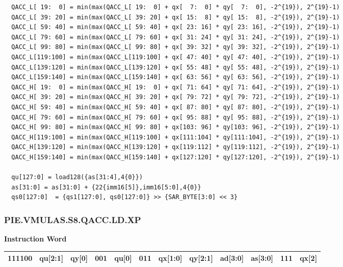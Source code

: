 \begin{lstlisting}
  QACC_L[ 19:  0] = min(max(QACC_L[ 19:  0] + qx[  7:  0] * qy[  7:  0], -2^{19}), 2^{19}-1)
  QACC_L[ 39: 20] = min(max(QACC_L[ 39: 20] + qx[ 15:  8] * qy[ 15:  8], -2^{19}), 2^{19}-1)
  QACC_L[ 59: 40] = min(max(QACC_L[ 59: 40] + qx[ 23: 16] * qy[ 23: 16], -2^{19}), 2^{19}-1)
  QACC_L[ 79: 60] = min(max(QACC_L[ 79: 60] + qx[ 31: 24] * qy[ 31: 24], -2^{19}), 2^{19}-1)
  QACC_L[ 99: 80] = min(max(QACC_L[ 99: 80] + qx[ 39: 32] * qy[ 39: 32], -2^{19}), 2^{19}-1)
  QACC_L[119:100] = min(max(QACC_L[119:100] + qx[ 47: 40] * qy[ 47: 40], -2^{19}), 2^{19}-1)
  QACC_L[139:120] = min(max(QACC_L[139:120] + qx[ 55: 48] * qy[ 55: 48], -2^{19}), 2^{19}-1)
  QACC_L[159:140] = min(max(QACC_L[159:140] + qx[ 63: 56] * qy[ 63: 56], -2^{19}), 2^{19}-1)
  QACC_H[ 19:  0] = min(max(QACC_H[ 19:  0] + qx[ 71: 64] * qy[ 71: 64], -2^{19}), 2^{19}-1)
  QACC_H[ 39: 20] = min(max(QACC_H[ 39: 20] + qx[ 79: 72] * qy[ 79: 72], -2^{19}), 2^{19}-1)
  QACC_H[ 59: 40] = min(max(QACC_H[ 59: 40] + qx[ 87: 80] * qy[ 87: 80], -2^{19}), 2^{19}-1)
  QACC_H[ 79: 60] = min(max(QACC_H[ 79: 60] + qx[ 95: 88] * qy[ 95: 88], -2^{19}), 2^{19}-1)
  QACC_H[ 99: 80] = min(max(QACC_H[ 99: 80] + qx[103: 96] * qy[103: 96], -2^{19}), 2^{19}-1)
  QACC_H[119:100] = min(max(QACC_H[119:100] + qx[111:104] * qy[111:104], -2^{19}), 2^{19}-1)
  QACC_H[139:120] = min(max(QACC_H[139:120] + qx[119:112] * qy[119:112], -2^{19}), 2^{19}-1)
  QACC_H[159:140] = min(max(QACC_H[159:140] + qx[127:120] * qy[127:120], -2^{19}), 2^{19}-1)

  qu[127:0] = load128({as[31:4],4{0}})
  as[31:0] = as[31:0] + {22{imm16[5]},imm16[5:0],4{0}}
  qs0[127:0]  = {qs1[127:0], qs0[127:0]} >> {SAR_BYTE[3:0] << 3}
\end{lstlisting}

\newpage
\subsubsection{PIE.VMULAS.S8.QACC.LD.XP}\label{instruction:PIEVMULASS8QACCLDXP}
\setlength\tabcolsep{6pt}
\textbf{Instruction Word} \\
\begin{tabular}{|c|c|c|c|c|c|c|c|c|c|c|c|}
	\hline
	111100 & qu[2:1] & qy[0] & 001 & qu[0] & 011 & qx[1:0] & qy[2:1] & ad[3:0] & as[3:0] & 111 & qx[2] \\
	\hline
\end{tabular}

